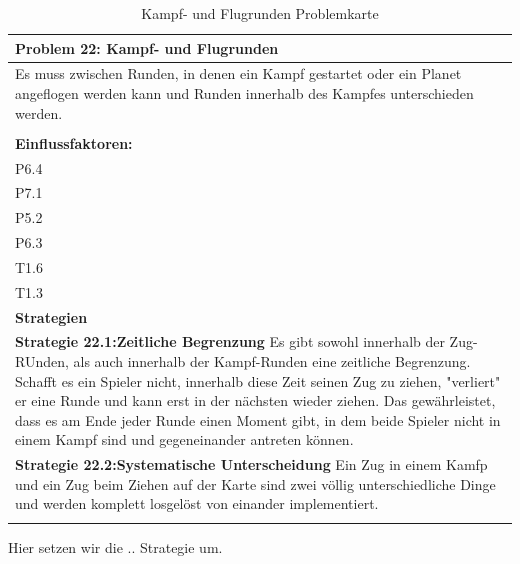 \documentclass[fontsize=12pt,paper=a4,twoside]{scrartcl}
\begin{document}
\begin{table}[H]
    \centering
    \begin{tabular}{|p{15cm}|}
    \hline
          \textbf{Problem 22: Kampf- und Flugrunden}  \\ \hline
	Es muss zwischen Runden, in denen ein Kampf gestartet oder ein Planet angeflogen werden kann und Runden innerhalb des Kampfes unterschieden werden. \\
         \\ \hline
          \textbf{Einflussfaktoren: } \\
	P6.4 \\	
	P7.1 \\
	P5.2 \\
	P6.3 \\
	T1.6 \\
	T1.3 \\
          \hline
          \textbf{Strategien} \\ \hline
            {}          
           \label{strategie:22.1}     
          \textbf{Strategie 22.1:Zeitliche Begrenzung} Es gibt sowohl innerhalb der Zug-RUnden, als auch innerhalb der Kampf-Runden eine zeitliche Begrenzung. Schafft es ein Spieler nicht, innerhalb diese Zeit seinen Zug zu ziehen, "verliert" er eine Runde und kann erst in der nächsten wieder ziehen. Das gewährleistet, dass es am Ende jeder Runde einen Moment gibt, in dem beide Spieler nicht in einem Kampf sind und gegeneinander antreten können.   \\        
  {}          
           \label{strategie:22.2}              
          \textbf{Strategie 22.2:Systematische Unterscheidung} Ein Zug in einem Kamfp und ein Zug beim Ziehen auf der Karte sind zwei völlig unterschiedliche Dinge und werden komplett losgelöst von einander implementiert.  \\
		 \\ \hline
    \end{tabular}

    \caption{Kampf- und Flugrunden Problemkarte}
    \label{tab:ProblemKarte22}
\end{table}
Hier setzen wir die .. Strategie um. \\
\end{document}
